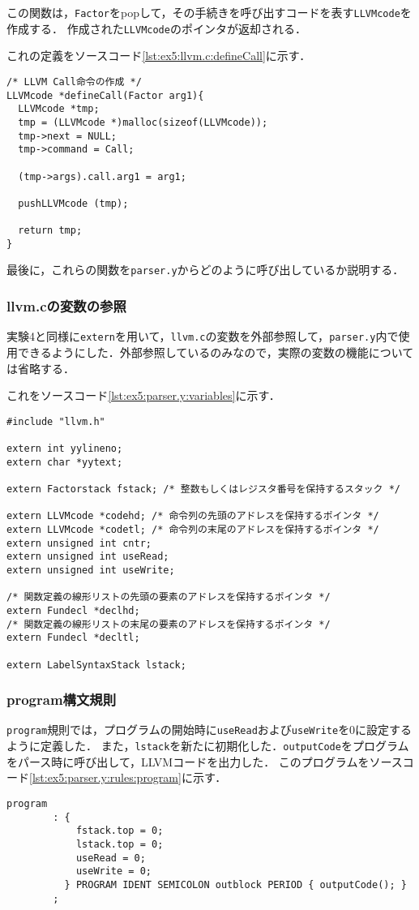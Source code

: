 \documentclass[uplatex]{jsarticle}
\begin{document}
この関数は，\verb#Factor#をpopして，その手続きを呼び出すコードを表す\verb#LLVMcode#を作成する．
作成された\verb#LLVMcode#のポインタが返却される．

これの定義をソースコード\ref{lst:ex5:llvm.c:defineCall}に示す．

\begin{lstlisting}[caption=defineCall関数の定義,label=lst:ex5:llvm.c:defineCall]
/* LLVM Call命令の作成 */
LLVMcode *defineCall(Factor arg1){
  LLVMcode *tmp;
  tmp = (LLVMcode *)malloc(sizeof(LLVMcode));
  tmp->next = NULL;
  tmp->command = Call;

  (tmp->args).call.arg1 = arg1;

  pushLLVMcode (tmp);

  return tmp;
}
\end{lstlisting}

最後に，これらの関数を\verb#parser.y#からどのように呼び出しているか説明する．

\subsubsection{llvm.cの変数の参照}
実験4と同様に\verb#extern#を用いて，\verb#llvm.c#の変数を外部参照して，\verb#parser.y#内で使用できるようにした．外部参照しているのみなので，実際の変数の機能については省略する．

これをソースコード\ref{lst:ex5:parser.y:variables}に示す．

\begin{lstlisting}[caption=変数の外部参照,label=lst:ex5:parser.y:variables]
#include "llvm.h"

extern int yylineno;
extern char *yytext;

extern Factorstack fstack; /* 整数もしくはレジスタ番号を保持するスタック */

extern LLVMcode *codehd; /* 命令列の先頭のアドレスを保持するポインタ */
extern LLVMcode *codetl; /* 命令列の末尾のアドレスを保持するポインタ */
extern unsigned int cntr;
extern unsigned int useRead;
extern unsigned int useWrite;

/* 関数定義の線形リストの先頭の要素のアドレスを保持するポインタ */
extern Fundecl *declhd;
/* 関数定義の線形リストの末尾の要素のアドレスを保持するポインタ */
extern Fundecl *decltl;

extern LabelSyntaxStack lstack;
\end{lstlisting}

\subsubsection{program構文規則}
\verb#program#規則では，プログラムの開始時に\verb#useRead#および\verb#useWrite#を0に設定するように定義した．
また，\verb#lstack#を新たに初期化した．\verb#outputCode#をプログラムをパース時に呼び出して，LLVMコードを出力した．
このプログラムをソースコード\ref{lst:ex5:parser.y:rules:program}に示す．
\begin{lstlisting}[caption=programの処理,label=lst:ex5:parser.y:rules:program]
program
        : {
            fstack.top = 0;
            lstack.top = 0;
            useRead = 0;
            useWrite = 0;
          } PROGRAM IDENT SEMICOLON outblock PERIOD { outputCode(); }
        ;
\end{lstlisting}
\end{document}
